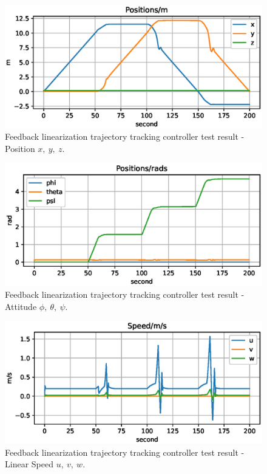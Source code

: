 \begin{figure}[H]
    \centering
    \includegraphics[width=.8\textwidth]{images/05fl-result-square-xyz.eps}
    \caption{Feedback linearization trajectory tracking controller test result - Position $x,\ y,\ z$.}
    \label{fig:05fl-result-square-xyz}
\end{figure}

\begin{figure}[H]
    \centering
    \includegraphics[width=.8\textwidth]{images/05fl-result-square-ptp.eps}
    \caption{Feedback linearization trajectory tracking controller test result - Attitude $\phi,\ \theta,\ \psi$.}
    \label{fig:05fl-result-square-ptp}
\end{figure}

\begin{figure}[H]
    \centering
    \includegraphics[width=.8\textwidth]{images/05fl-result-square-uvw.eps}
    \caption{Feedback linearization trajectory tracking controller test result - Linear Speed $u,\ v,\ w$.}
    \label{fig:05fl-result-square-uvw}
\end{figure}


